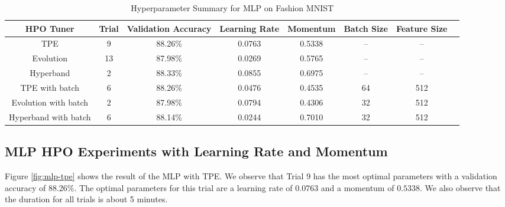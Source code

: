 \documentclass{article}
\begin{document}
\begin{table}[ht]
\caption{Hyperparameter Summary for MLP on Fashion MNIST} %
\centering %
\begin{tabular}{c c c c c c c c } %
\hline\hline %
HPO Tuner & Trial & Validation Accuracy & Learning Rate & Momentum & Batch Size & Feature Size \\ [0.5ex] %
\hline %
TPE                  & 9  & 88.26\% & 0.0763 & 0.5338 & -- & --  \\
Evolution            & 13 & 87.98\% & 0.0269 & 0.5765 & -- & --  \\
Hyperband            & 2  & 88.33\% & 0.0855 & 0.6975 & -- & --  \\
TPE with batch       & 6  & 88.26\% & 0.0476 & 0.4535 & 64 & 512 \\
Evolution with batch & 2  & 87.98\% & 0.0794 & 0.4306 & 32 & 512 \\
Hyperband with batch & 6  & 88.14\% & 0.0244 & 0.7010 & 32 & 512 \\
[1ex] %
\hline %
\end{tabular}
\label{table:summary} %
\end{table}


\subsection{MLP HPO Experiments with Learning Rate and Momentum}
Figure \ref{fig:mlp-tpe} shows the result of the MLP with TPE. We observe that Trial 9 has the most optimal parameters with a validation accuracy of 88.26\%. The optimal parameters for this trial are a learning rate of $0.0763$ and a momentum of $0.5338$. We also observe that the duration for all trials is about 5 minutes.
\end{document}
